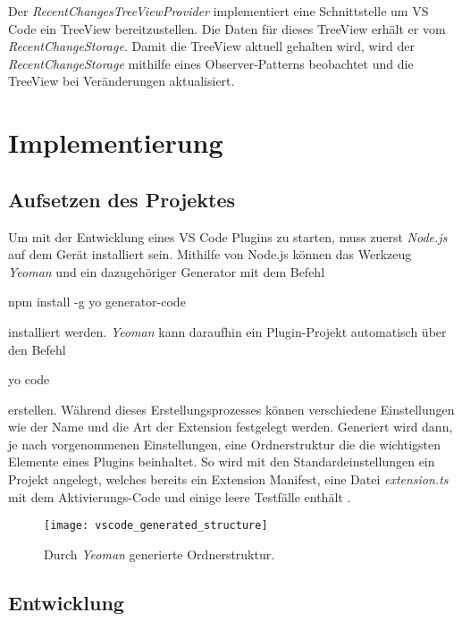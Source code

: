 Der \emph{RecentChangesTreeViewProvider} implementiert eine Schnittstelle
um VS Code ein TreeView bereitzustellen. Die Daten für dieses TreeView
erhält er vom \emph{RecentChangeStorage}. Damit die TreeView aktuell
gehalten wird, wird der \emph{RecentChangeStorage} mithilfe eines Observer-Patterns \cite{2005Dp:e}
beobachtet und die TreeView bei Veränderungen aktualisiert.


\section{Implementierung}
\label{sec:EntwicklungVsCode_Implementierung}

\subsection{Aufsetzen des Projektes}

Um mit der Entwicklung eines VS Code Plugins zu starten, muss zuerst \emph{Node.js} \cite{NodeJSWebsite}
auf dem Gerät installiert sein. Mithilfe von Node.js können das Werkzeug
\emph{Yeoman} \cite{YeomanWebsite} und ein dazugehöriger Generator mit dem Befehl
\begin{GenericCode}[numbers=none]
    npm install -g yo generator-code
\end{GenericCode}
installiert werden.
\emph{Yeoman} kann daraufhin ein Plugin-Projekt automatisch über den Befehl
\begin{GenericCode}[numbers=none]
    yo code
\end{GenericCode}
erstellen. Während dieses Erstellungsprozesses können verschiedene Einstellungen
wie der Name und die Art der Extension festgelegt werden. Generiert wird dann,
je nach vorgenommenen Einstellungen, eine Ordnerstruktur die die wichtigsten
Elemente eines Plugins beinhaltet. So wird mit den Standardeinstellungen
ein Projekt angelegt, welches bereits ein Extension Manifest, eine Datei 
\emph{extension.ts} mit dem Aktivierungs-Code und einige leere Testfälle enthält
\cite{VSCodeExtensionAPIYourFirstExtension}.

\begin{figure}
    \centering
    \texttt{[image: vscode\_generated\_structure]}
    \caption{Durch \emph{Yeoman} generierte Ordnerstruktur.}
    \label{fig:vscode_generated_structure}
\end{figure}   

\subsection{Entwicklung}

